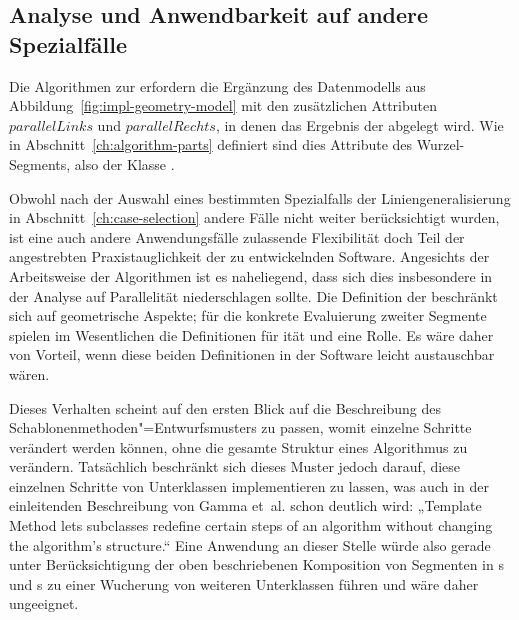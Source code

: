 \documentclass[../main/thesis.tex]{subfiles}
\begin{document}




\subsection{Analyse und Anwendbarkeit auf andere Spezialfälle}

Die Algorithmen zur  erfordern die Ergänzung des Datenmodells aus Abbildung~\ref{fig:impl-geometry-model} mit den zusätzlichen Attributen $parallelLinks$ und $parallelRechts$, in denen das Ergebnis der  abgelegt wird.
Wie in Abschnitt~\ref{ch:algorithm-parts} definiert sind dies Attribute des Wurzel-Segments, also der Klasse .

Obwohl nach der Auswahl eines bestimmten Spezialfalls der Liniengeneralisierung in Abschnitt~\ref{ch:case-selection} andere Fälle nicht weiter berücksichtigt wurden, ist eine auch andere Anwendungsfälle zulassende Flexibilität doch Teil der angestrebten Praxistauglichkeit der zu entwickelnden Software.
Angesichts der Arbeitsweise der Algorithmen ist es naheliegend, dass sich dies insbesondere in der Analyse auf Parallelität niederschlagen sollte.
Die Definition der  beschränkt sich auf geometrische Aspekte; für die konkrete Evaluierung zweiter Segmente spielen im Wesentlichen die Definitionen für ität und  eine Rolle.
Es wäre daher von Vorteil, wenn diese beiden Definitionen in der Software leicht austauschbar wären.

Dieses Verhalten scheint auf den ersten Blick auf die Beschreibung des Schablonenmethoden"=Entwurfsmusters  zu passen, womit einzelne Schritte verändert werden können, ohne die gesamte Struktur eines Algorithmus zu verändern.
Tatsächlich beschränkt sich dieses Muster jedoch darauf, diese einzelnen Schritte von Unterklassen implementieren zu lassen, was auch in der einleitenden Beschreibung von Gamma et~al. schon deutlich wird:
„Template Method lets subclasses redefine certain steps of an algorithm without changing the algorithm's structure.“ 
Eine Anwendung an dieser Stelle würde also gerade unter Berücksichtigung der oben beschriebenen Komposition von Segmenten in s und s zu einer Wucherung von weiteren Unterklassen führen und wäre daher ungeeignet.
\end{document}
